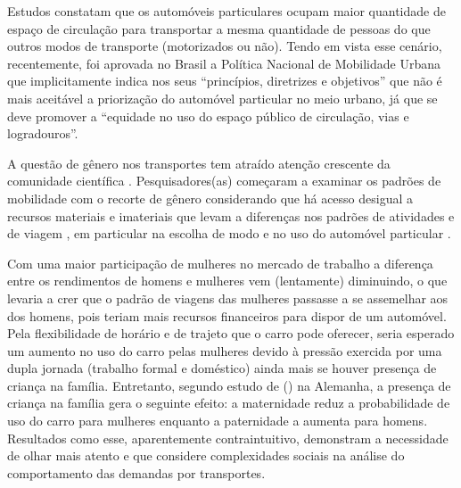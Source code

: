 Estudos constatam \cite{VASCONCELLOS2001,RUEDA2007} que os automóveis particulares ocupam maior quantidade de espaço de circulação para transportar a mesma quantidade de pessoas do que outros modos de transporte (motorizados ou não).  
Tendo em vista esse cenário, recentemente, foi aprovada no Brasil a Política Nacional de Mobilidade Urbana \cite{PNMU} que implicitamente indica nos seus ``princípios, diretrizes e objetivos'' que não é mais aceitável a priorização do automóvel particular no meio urbano, já que se deve promover a ``equidade no uso do espaço público de circulação, vias e logradouros''.

A questão de gênero nos transportes tem atraído atenção crescente da comunidade científica \cite{ROSENBLOOM1978,HANSON1985,ROSENBLOOM2006,UTENG2008,HANSON2010}.
Pesquisadores(as) começaram a examinar os padrões de mobilidade com o recorte de gênero considerando que há acesso desigual a recursos materiais e imateriais \cite{HOWE1982,HANSON1995,ELMHIRST2003,RAJU2005} que levam a diferenças nos padrões de atividades e de viagem \cite{FAGNANI1983,LAFFERTY1991,IBIPO1992,ROOT1999,SCHWANEN2002,SONG2003,
MCNUCKIN2005,CRANE2007,VASCONCELLOS2012}, em particular na escolha de modo e no uso do automóvel particular \cite{FOX1983,HJORTHOL2000,POLK2003,BEST2005}.

Com uma maior participação de mulheres no mercado de trabalho a diferença entre os rendimentos de homens e mulheres vem (lentamente) diminuindo, o que levaria a crer que o padrão de viagens das mulheres passasse a se assemelhar aos dos homens, pois teriam mais recursos financeiros para dispor de um automóvel. Pela flexibilidade de horário e de trajeto que o carro pode oferecer, seria esperado um aumento no uso do carro pelas mulheres devido à pressão exercida por uma dupla jornada (trabalho formal e doméstico) ainda mais se houver presença de criança na família. Entretanto, segundo estudo de   (\citeyear{BEST2005}) na Alemanha, a presença de criança na família gera o seguinte efeito: a maternidade reduz a probabilidade de uso do carro para mulheres enquanto a paternidade a aumenta para homens.
Resultados como esse, aparentemente contraintuitivo, demonstram a necessidade de olhar mais atento e que considere complexidades sociais na análise do comportamento das demandas por transportes. 


